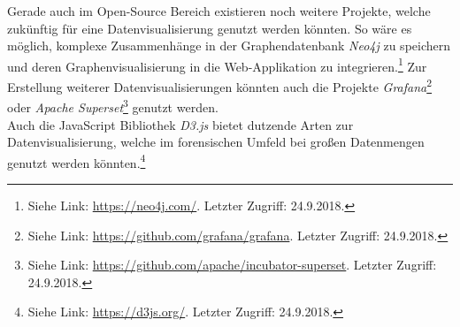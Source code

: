 \noindent
Gerade auch im Open-Source Bereich existieren noch weitere Projekte, welche zukünftig für eine Datenvisualisierung genutzt werden könnten. So wäre es möglich, komplexe Zusammenhänge in der Graphendatenbank \textit{Neo4j} zu speichern und deren Graphenvisualisierung in die Web-Applikation zu integrieren.\footnote{Siehe Link: \url{https://neo4j.com/}. Letzter Zugriff: 24.9.2018.} Zur Erstellung weiterer Datenvisualisierungen könnten auch die Projekte \textit{Grafana}\footnote{Siehe Link: \url{https://github.com/grafana/grafana}. Letzter Zugriff: 24.9.2018.} oder \textit{Apache Superset}\footnote{Siehe Link: \url{https://github.com/apache/incubator-superset}. Letzter Zugriff: 24.9.2018.} genutzt werden.\\
Auch die JavaScript Bibliothek \textit{D3.js} bietet dutzende Arten zur Datenvisualisierung, welche im forensischen Umfeld bei großen Datenmengen genutzt werden könnten.\footnote{Siehe Link: \url{https://d3js.org/}. Letzter Zugriff: 24.9.2018.}\\




